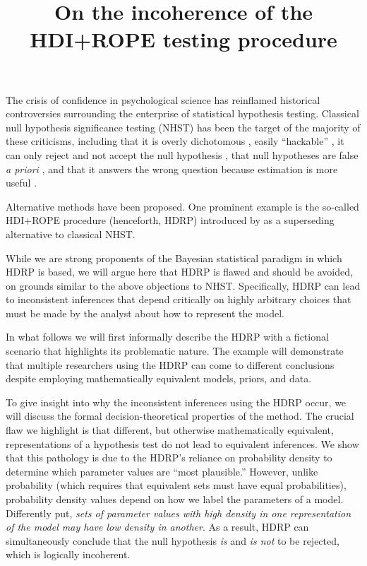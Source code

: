 \documentclass[9pt,twocolumn,twoside]{cidlab-draft}\templatetype{cidlab-invited}
\title{On the %
incoherence of the HDI+ROPE testing procedure}
\newcommand{\hdr}{HDRP}
\begin{document}
\maketitle

\noindent The crisis of confidence in psychological science has reinflamed historical controversies surrounding the enterprise of statistical hypothesis testing.  Classical null hypothesis significance testing (NHST) has been the target of the majority of these criticisms, including that it is overly dichotomous \cite{gibson2021}, easily ``hackable'' \cite{SimmonsEtAl2011}, it can only reject and not accept the null hypothesis \cite{Rouder2009ttest}, that null hypotheses are false \textit{a priori} \cite{Cohen1994,mcshane2019}, and that it answers the wrong question because estimation is more useful \cite{Cumming2014}.

Alternative methods have been proposed. One prominent example is the so-called HDI+ROPE procedure (henceforth, \hdr{}) introduced by  as a superseding alternative to classical NHST.  

While we are strong proponents of the Bayesian statistical paradigm \cite{EtzSI,Vandekerckhove2018} in which \hdr{} is based, we will argue here that \hdr{} is flawed and should be avoided, on grounds similar to the above objections to NHST.  Specifically, \hdr{} can lead to inconsistent inferences that depend critically on highly arbitrary choices that must be made by the analyst about how to represent the model. 

In what follows we will first informally describe the \hdr{} with a fictional scenario that highlights its problematic nature. The example will demonstrate that multiple researchers using the \hdr{} can come to different conclusions despite employing mathematically equivalent models, priors, and data. 

To give insight into why the inconsistent inferences using the \hdr{} occur, we will discuss the formal decision-theoretical properties of the method. The crucial flaw we highlight is that different, but otherwise mathematically equivalent, representations of a hypothesis test do not lead to equivalent inferences. We show that this pathology is due to the \hdr{}'s reliance on probability density to determine which parameter values are ``most plausible.'' However, unlike probability (which requires that equivalent sets must have equal probabilities), probability density values depend on how we label the parameters of a model.  Differently put, \textit{sets of parameter values with high density in one representation of the model may have low density in another}. As a result, \hdr{} can simultaneously conclude that the null hypothesis \textit{is} and \textit{is not} to be rejected, which is logically incoherent.
\end{document}
